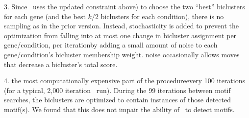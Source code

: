 3. Since \cm\ uses the updated constraint \DIFdelbegin {}\DIFdelend \DIFaddbegin {}\DIFdelbegin \DIFdel{, }\DIFdelend \DIFaddbegin {}\DIFaddend above) to choose
the two ``best'' biclusters for each gene (and \DIFaddbegin {}\DIFaddend the best $k/2$
biclusters for each condition), there is no sampling as in the prior
version. Instead, stochasticity is added \DIFdelbegin \DIFdel{, }\DIFdelend to prevent the optimization
from falling into \DIFdelbegin {}\DIFdelend \DIFaddbegin {}\DIFaddend at most one
change in bicluster assignment per gene/condition, per iteration\DIFdelbegin {}\DIFdelend \DIFaddbegin {}\DIFaddend by adding a small amount of \DIFdelbegin {}\DIFdelend noise to each
gene/condition's bicluster membership weight. \DIFdelbegin {}\DIFdelend \DIFaddbegin {}\DIFaddend noise occasionally
allows moves that decrease a bicluster's total score\DIFdelbegin {}\DIFdelend \DIFaddbegin {}\DIFaddend .

4. \DIFdelbegin {}\DIFdelend \DIFaddbegin {}\DIFaddend the most computationally expensive part of the
procedure\DIFdelbegin {}\DIFdelend \DIFaddbegin {}\DIFaddend every 100 iterations (for a typical,
2,000 iteration \cm\ run). During the 99 iterations between motif
searches, the biclusters are optimized to contain instances of those
detected motif(s). We found that this does not impair the ability of
\cm\ to detect \DIFdelbegin {}\DIFdelend motifs.

\DIFdelbegin {}%

